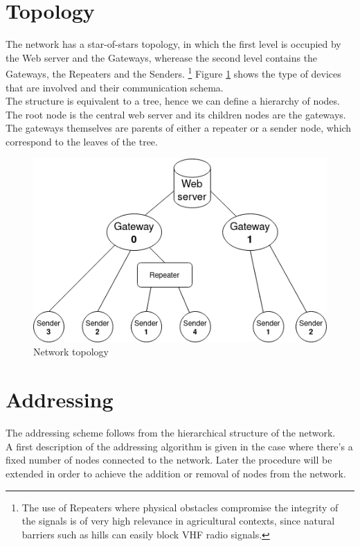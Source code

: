 \section{Topology}
The network has a star-of-stars topology, in which the first level is occupied by the Web server and the
Gateways, wherease the second level contains the Gateways, the Repeaters and the Senders. \footnote{The use of Repeaters where
physical obstacles compromise the integrity of the signals is of very high
relevance in agricultural contexts, since natural barriers such as hills can easily block \gls{VHF} radio signals.}
Figure \ref{network topology img} shows the type of devices that are involved and their communication schema. \\
The structure is equivalent to a tree, hence we can define a hierarchy of nodes. The root node is the central web server
and its children nodes are the gateways. The gateways themselves are parents of either a repeater or a sender node,
which correspond to the leaves of the tree.

\begin{figure}[ht]
    \centering
    \includegraphics[width=350pt]{uml/network_topology.png}
    \caption{Network topology}
    \label{network topology img}
\end{figure}

\section{Addressing}
The addressing scheme follows from the hierarchical structure of the network.\\
A first description of the addressing algorithm is given in the case where there's a fixed number of nodes connected to the
network. Later the procedure will be extended in order to achieve the addition or removal of nodes from the network.


